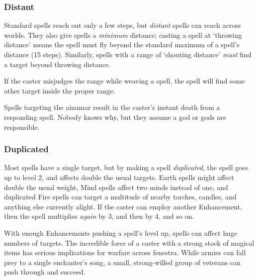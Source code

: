\begin{multicols}{2}
\subsubsection{Distant}

Standard spells reach out only a few steps, but \textit{distant} spells can reach across worlds.
They also give spells a \emph{minimum} distance; casting a spell at `throwing distance' means the spell must fly beyond the standard maximum of a spell's distance (15 steps).
Similarly, spells with a range of `shouting distance' \emph{must} find a target beyond throwing distance.


If the caster misjudges the range while weaving a spell, the spell will find some other target inside the proper range.

Spells targeting the \gls{ainumar} result in the caster's instant death from a responding spell.
Nobody knows why, but they assume a god or gods are responsible.

\subsubsection{Duplicated}

Most spells have a single target, but by making a spell \textit{duplicated}, the spell goes up to level 2, and affects double the usual targets.
Earth spells might affect double the usual \gls{weight}, Mind spells affect two minds instead of one, and duplicated Fire spells can target a multitude of nearby torches, candles, and anything else currently alight.
If the caster can employ another Enhancement, then the spell multiplies \emph{again} by 3, and then by 4, and so on.


With enough Enhancements pushing a spell's level up, spells can affect huge numbers of targets.
The incredible force of a caster with a strong stock of magical items has serious implications for warfare across \gls{fenestra}.
While armies can fall prey to a single enchanter's song, a small, strong-willed group of veterans can push through and succeed.

\end{multicols}

